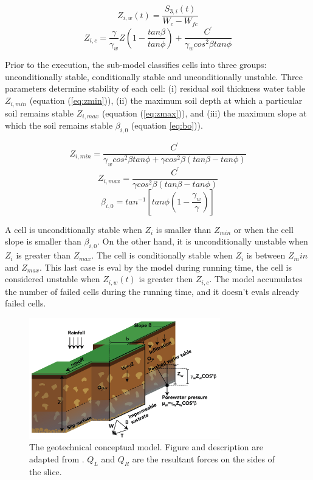 \documentclass[hess, manuscript]{copernicus}
\begin{document}
\begin{equation}
 Z_{i,w}(t) = \frac{S_{3,i}(t)}{W_c - W_{fc}}
 \label{eq:z}
\end{equation}
\begin{equation}
 Z_{i,c} = \frac{\gamma}{\gamma_w} Z \left( 1-\frac{tan \beta}{tan\phi} \right)
     + \frac{C^{'}}{\gamma_w cos^2 \beta tan\phi}
 \label{eq:Zcrit}
\end{equation}

Prior to the execution, the sub-model classifies cells into three groups: unconditionally stable, conditionally stable and unconditionally unstable. Three parameters determine stability of each cell: (i) residual soil thickness water table $Z_{i,min}$ (equation (\ref{eq:zmin})), (ii) the maximum soil depth at which a particular soil remains stable $Z_{i,max}$  (equation (\ref{eq:zmax})), and (iii) the maximum slope at which the soil remains stable $\beta_{i,0}$ (equation \ref{eq:bo})). 

\begin{equation}
 Z_{i,min} = \frac{C^{'}}{\gamma_w cos^2 \beta tan \phi + \gamma cos^2 \beta (tan\beta - tan \phi)}
    \label{eq:zmin}
\end{equation}
\begin{equation}
 Z_{i,max} = \frac{C^{'}}{\gamma cos^2 \beta (tan\beta - tan \phi)}
 \label{eq:zmax}
\end{equation}
\begin{equation}
 \beta_{i,0} = tan ^{-1} \left[ tan \phi \left( 1- \frac{\gamma_w}{\gamma}\right) \right]
 \label{eq:bo}
\end{equation}

A cell is unconditionally stable when $Z_i$ is smaller than $Z_{min}$ or when the cell slope is smaller than  $ \beta_{i,0}$. On the other hand, it is unconditionally unstable when $Z_i$ is greater than $Z_{max}$. The cell is conditionally stable when $Z_i$ is between $Z_min$ and $Z_{max}$.  This last case is eval by the model during running time, the cell is considered unstable when $Z_{i,w}(t)$ is greater then $Z_{i,c}$.  The model accumulates the number of failed cells during the running time, and it doesn't evals already failed cells.

\begin{figure}[t]
\centering
 \includegraphics[width=8.3cm]{Figures/slides-escheme.jpg}
 \caption{The geotechnical conceptual model. Figure and description are adapted from \citet{Aristizabal2016}. $Q_L$ and $Q_R$ are the resultant forces on the sides of the slice. }
    \label{fig:ModeloEstabilidad}
\end{figure}
\end{document}
